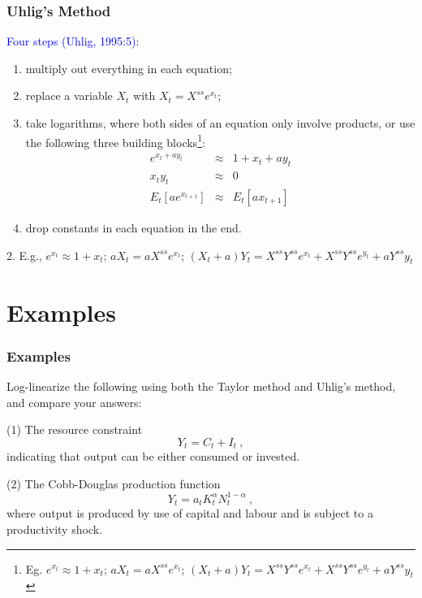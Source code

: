 \documentclass[10pt, handout]{beamer}
\begin{document}
\begin{frame}

\frametitle{Uhlig's Method} \vskip 0.1in

\textcolor{blue}{Four steps (Uhlig, 1995:5):}

\begin{enumerate}
\item multiply out everything in each equation;
\item replace a variable $X_t$ with $X_t=X^{ss}e^{x_t}$;
\item take logarithms, where both sides of an equation only involve
products, or use the following three building blocks\footnote{Eg.
$e^{x_t}\approx 1+x_{t}$; $aX_{t}=aX^{ss}e^{x_{t}}$;
$(X_t+a)Y_t=X^{ss}Y^{ss}e^{x_t}+X^{ss}Y^{ss}e^{y_t}+aY^{ss}y_t$}:
\begin{eqnarray}
e^{x_{t}+ay_{t}} &\approx& 1+x_t+ay_t\\
x_t y_t &\approx& 0\\
E_{t}[ae^{x_{t+1}}] &\approx& E_{t}[ax_{t+1}]
\end{eqnarray}
\item drop constants in each equation in the end.
\end{enumerate}

\vfill

{\footnotesize {2. E.g.,
$e^{x_t}\approx 1+x_{t}$; $aX_{t}=aX^{ss}e^{x_{t}}$;
$(X_t+a)Y_t=X^{ss}Y^{ss}e^{x_t}+X^{ss}Y^{ss}e^{y_t}+aY^{ss}y_t$}}


\end{frame}


\section{Examples}

\begin{frame}

\frametitle{Examples} 

Log-linearize the following using both the Taylor method and Uhlig's method, and compare your answers: \vskip0.2in

(1) The resource constraint $$Y_t = C_t + I_t ~,$$ indicating that output can be either consumed or invested.\vskip0.1in

(2) The Cobb-Douglas production function $$Y_t=a_{t}K^{\alpha}_{t}N^{1-\alpha}_t ~,$$ where output is produced by use of capital and labour and is subject to a productivity shock.

\end{frame}
\end{document}
